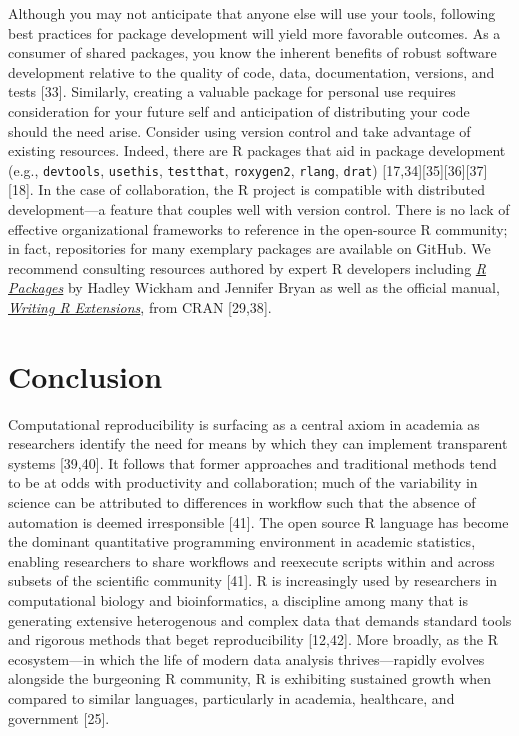 \documentclass[10pt,letterpaper]{article}
\begin{document}
Although you may not anticipate that anyone else will use your tools,
following best practices for package development will yield more
favorable outcomes. As a consumer of shared packages, you know the
inherent benefits of robust software development relative to the quality
of code, data, documentation, versions, and tests {[}33{]}. Similarly,
creating a valuable package for personal use requires consideration for
your future self and anticipation of distributing your code should the
need arise. Consider using version control and take advantage of
existing resources. Indeed, there are R packages that aid in package
development (e.g., \texttt{devtools}, \texttt{usethis},
\texttt{testthat}, \texttt{roxygen2}, \texttt{rlang}, \texttt{drat})
{[}17,34{]}{[}35{]}{[}36{]}{[}37{]}{[}18{]}. In the case of
collaboration, the R project is compatible with distributed
development---a feature that couples well with version control. There is
no lack of effective organizational frameworks to reference in the
open-source R community; in fact, repositories for many exemplary
packages are available on GitHub. We recommend consulting resources
authored by expert R developers including
\href{https://r-pkgs.org/}{\emph{R Packages}} by Hadley Wickham and
Jennifer Bryan as well as the official manual,
\href{https://cran.r-project.org/doc/manuals/r-release/R-exts.html}{\emph{Writing
R Extensions}}, from CRAN {[}29,38{]}.

\hypertarget{conclusion}{%
\section{Conclusion}\label{conclusion}}

Computational reproducibility is surfacing as a central axiom in
academia as researchers identify the need for means by which they can
implement transparent systems {[}39,40{]}. It follows that former
approaches and traditional methods tend to be at odds with productivity
and collaboration; much of the variability in science can be attributed
to differences in workflow such that the absence of automation is deemed
irresponsible {[}41{]}. The open source R language has become the
dominant quantitative programming environment in academic statistics,
enabling researchers to share workflows and reexecute scripts within and
across subsets of the scientific community {[}41{]}. R is increasingly
used by researchers in computational biology and bioinformatics, a
discipline among many that is generating extensive heterogenous and
complex data that demands standard tools and rigorous methods that beget
reproducibility {[}12,42{]}. More broadly, as the R ecosystem---in which
the life of modern data analysis thrives---rapidly evolves alongside the
burgeoning R community, R is exhibiting sustained growth when compared
to similar languages, particularly in academia, healthcare, and
government {[}25{]}.
\end{document}
